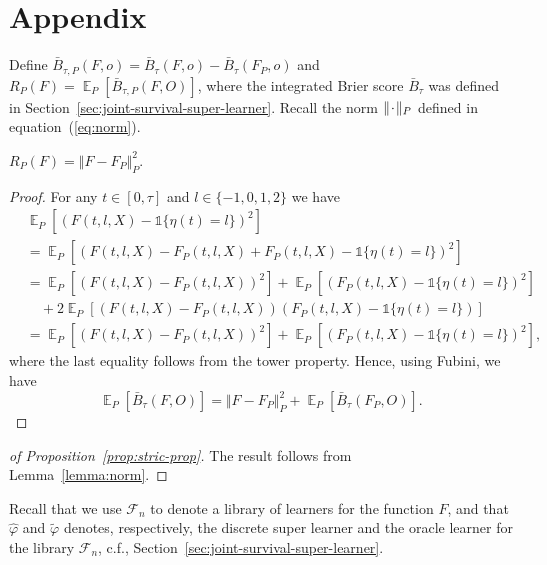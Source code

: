 \documentclass[lineno]{biometrika}
\DeclareMathOperator{\E}{\mathbb{E}} %
\newcommand{\blank}{\makebox[1ex]{\textbf{$\cdot$}}}
\renewcommand{\phi}{\varphi}
\newcommand{\1}{\mathds{1}}
\begin{document}
\appendix

\section*{Appendix}


Define
\( \bar{B}_{\tau,P}(F, o) = \bar{B}_{\tau}(F, o) -
\bar{B}_{\tau}(F_P, o) \) and
\( R_{P}(F) = \E_P{[\bar{B}_{\tau,P}(F, O)]} \), where the
integrated Brier score \( \bar{B}_{\tau} \) was defined in
Section~\ref{sec:joint-survival-super-learner}. Recall the norm
\( \Vert \blank \Vert_{P}\) defined in
equation~(\ref{eq:norm}).

\begin{lemma}
  \label{lemma:norm}
  \( R_{P}(F) = \Vert F - F_P \Vert_{P}^2 \).
\end{lemma}
\begin{proof}
  For any \( t \in [0, \tau] \) and \( l\in \{-1,0,1,2\} \) we have
  \begin{align*}
    & \E_{P}{\left[ (F(t, l, X) - \1{\{\eta(t) = l \}})^2 \right]}
    \\
    & =    \E_{P}{\left[ (F(t, l, X) - F_P(t, l, X) + F_P(t, l, X) - \1{\{\eta(t) = l
      \}})^2 \right]}
    \\
    & =    \E_{P}{\left[ (F(t, l, X) - F_P(t, l, X))^2\right]}
      + \E_{P}{\left[ (F_P(t, l, X) - \1{\{\eta(t) = l \}})^2\right]}
    \\
    & \quad
      + 2\E_{P}{\left[ (F(t, l, X) - F_P(t, l, X))(F_P(t, l, X) - \1{\{\eta(t) = l
      \}})\right]}
    \\
    & =    \E_{P}{\left[ (F(t, l, X) - F_P(t, l, X))^2\right]}
      + \E_{P}{\left[ (F_P(t, l, X) - \1{\{\eta(t) = l \}})^2\right]},
  \end{align*}
  where the last equality follows from the tower property. Hence, using Fubini,
  we have
  \begin{equation*}
    \E_P{[\bar{B}_{\tau}(F, O)]}
    = \Vert F - F_P \Vert_{P}^2 + \E_P{[\bar{B}_{\tau}(F_P, O)]}.
  \end{equation*}
\end{proof}

\begin{proof}[of Proposition~\ref{prop:stric-prop}]
  The result follows from Lemma~\ref{lemma:norm}.
\end{proof}

Recall that we use \( \mathcal{F}_n \) to denote a library of learners for the
function \( F \), and that \( \hat{\phi} \) and \( \tilde{\phi} \) denotes,
respectively, the discrete super learner and the oracle learner for the library
\( \mathcal{F}_n \), c.f., Section~\ref{sec:joint-survival-super-learner}.
\end{document}
